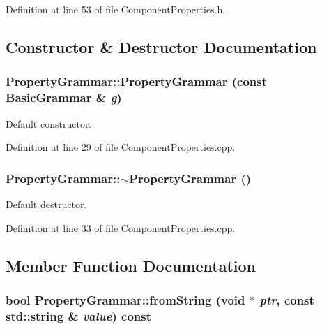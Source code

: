 Definition at line 53 of file ComponentProperties.h.

\subsection{Constructor \& Destructor Documentation}
\hypertarget{class_d_d4hep_1_1_property_grammar_a667cf30a8e7df73005e88e30871716c8}{
\subsubsection[{PropertyGrammar}]{\setlength{\rightskip}{0pt plus 5cm}PropertyGrammar::PropertyGrammar (const {\bf BasicGrammar} \& {\em g})}}
\label{class_d_d4hep_1_1_property_grammar_a667cf30a8e7df73005e88e30871716c8}


Default constructor. 

Definition at line 29 of file ComponentProperties.cpp.\hypertarget{class_d_d4hep_1_1_property_grammar_a5de8cc9e35a539f8ad254950e6f1f6dc}{
\subsubsection[{$\sim$PropertyGrammar}]{\setlength{\rightskip}{0pt plus 5cm}PropertyGrammar::$\sim$PropertyGrammar ()}}
\label{class_d_d4hep_1_1_property_grammar_a5de8cc9e35a539f8ad254950e6f1f6dc}


Default destructor. 

Definition at line 33 of file ComponentProperties.cpp.

\subsection{Member Function Documentation}
\hypertarget{class_d_d4hep_1_1_property_grammar_afe1395246530dea8a90baaf3747ffe5e}{
\subsubsection[{fromString}]{\setlength{\rightskip}{0pt plus 5cm}bool PropertyGrammar::fromString (void $\ast$ {\em ptr}, \/  const std::string \& {\em value}) const}}
\label{class_d_d4hep_1_1_property_grammar_afe1395246530dea8a90baaf3747ffe5e}


